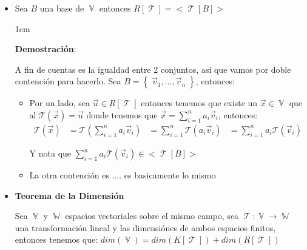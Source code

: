 \documentclass[12pt, fleqn]{article}                             %
\newenvironment{SmallIndentation}[1][0.75em]                    %
        {\begin{adjustwidth}{#1}{}\begin{footnotesize}}             %
        {\end{footnotesize}\end{adjustwidth}}                       %
\theoremstyle{break}                                            %
\DeclareMathOperator \VectorSet    {\mathbb{V}}                 %
\DeclareMathOperator \SubVectorSet {\mathbb{W}}                 %
\DeclareMathOperator \LinealTransformation {\mathcal{T}}        %
\DeclareMathOperator \LinTrans {\mathcal{T}}                    %
\newcommand{\Set}[1]    {\left\{ \; #1 \; \right\}}             %
\newcommand{\Wrap}[1]    {\left( #1 \right)}                    %
\newcommand{\FnLinTrans}[1]{\mathcal{T}\Wrap{#1}}               %
\begin{document}
        \begin{itemize}
            \item Sea $B$ una base de $\VectorSet$ entonces $R[\LinealTransformation] = <\LinTrans[B]>$ 

                \begin{SmallIndentation}[1em]
                    \textbf{Demostración}:
                    
                    A fin de cuentas es la igualdad entre 2 conjuntos, así que vamos por doble contención
                    para hacerlo. Sea $B = \Set{\vec v_1, \dots, \vec v_n}$, entonces:

                    \begin{itemize}
                        \item 
                            Por un lado, sea $\vec u \in R[\LinealTransformation]$ entonces
                            tenemos que existe un $\vec x \in \VectorSet$ que al $\FnLinTrans{\vec x} = \vec u$
                            donde tenemos que $\vec x = \sum_{i=1}^n a_i \vec v_i$, entonces:
                            \begin{align*}
                                \FnLinTrans{\vec x} 
                                    &= \FnLinTrans{\sum_{i=1}^n a_i \vec v_i} 
                                    &= \sum_{i=1}^n \FnLinTrans{a_i \vec v_i} 
                                    &= \sum_{i=1}^n a_i \FnLinTrans{\vec v_i} 
                            \end{align*}

                                Y nota que $\sum_{i=1}^n a_i \FnLinTrans{\vec v_i} \in <\LinTrans[B]>$ 

                       \item
                        La otra contención es .... es basicamente lo mismo

                    \end{itemize}

                \end{SmallIndentation}

            \item \textbf{Teorema de la Dimensión}

                Sea $\VectorSet$ y $\SubVectorSet$ espacios vectoriales sobre el mismo campo, sea 
                $\LinTrans: \VectorSet \to \SubVectorSet$
                una transformación lineal y las dimensiónes de ambos espacios finitos, entonces
                tenemos que:
                $dim(\VectorSet) = dim(K[\LinTrans]) + dim(R[\LinTrans])$


\end{itemize}
\end{document}
